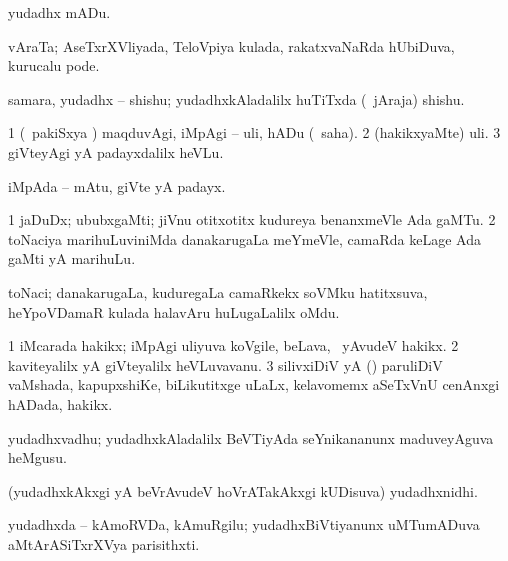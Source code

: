 \bentry
{} 
\gl{\akirx}
\bmng
yudadhx mADu. 
\emng
\eentry

\bentry
{} 
\gl{\saMkiSx}
\expl{}
\bmng
{} 
\emng
\eentry

\bentry
{} 
\gl{\nA}
\expl{}
\bmng
vAraTa; AseTxrXVliyada, TeloVpiya kulada, rakatxvaNaRda hUbiDuva, kurucalu pode. 
\emng
\eentry

\bentry
{} 
\gl{\nA}
\expl{}
\bmng
samara, yudadhx -- shishu; yudadhxkAladalilx huTiTxda (\kanmu\ jAraja) shishu. 
\emng
\eentry

\bentry
{} 
\gl{\sakirx}
\expl{}
\bmng
\bnum
\num{1} (\kanmu\ pakiSxya \vi) maqduvAgi, iMpAgi -- uli, hADu (\akirx\ saha). 
\num{2} (hakikxyaMte) uli. 
\num{3} giVteyAgi yA padayxdalilx heVLu. 
\enum
\emng
\eentry

\bentry
{} 
\gl{\nA}
\expl{}
\bmng
iMpAda -- mAtu, giVte yA padayx. 
\emng
\eentry

\bentry
{} 
\gl{\nA}
\expl{}
\bmng
\bnum
\num{1} jaDuDx; ububxgaMti; jiVnu otitxotitx kudureya benanxmeVle Ada gaMTu. 
\num{2} toNaciya marihuLuviniMda danakarugaLa meYmeVle, camaRda keLage Ada gaMti yA marihuLu. 
\enum
\emng
\eentry

\bentry
{} 
\gl{\nA}
\expl{}
\bmng
toNaci; danakarugaLa, kuduregaLa camaRkekx soVMku hatitxsuva, heYpoVDamaR kulada halavAru huLugaLalilx oMdu. 
\emng
\eentry

\bentry
{} 
\gl{\nA}
\expl{}
\bmng
\bnum
\num{1} iMcarada hakikx; iMpAgi uliyuva koVgile, beLava, \mo\ yAvudeV hakikx. 
\num{2} kaviteyalilx yA giVteyalilx heVLuvavanu. 
\num{3} silivxiDiV yA (\ame) paruliDiV vaMshada, kapupxshiKe, biLikutitxge uLaLx, kelavomemx aSeTxVnU cenAnxgi hADada, hakikx. 
\enum
\emng
\eentry

\bentry
{} 
\gl{\nA}
\expl{}
\bmng
yudadhxvadhu; yudadhxkAladalilx BeVTiyAda seYnikananunx maduveyAguva heMgusu. 
\emng
\eentry

\bentry
{} 
\gl{\nA}
\expl{}
\bmng
(yudadhxkAkxgi yA beVrAvudeV hoVrATakAkxgi kUDisuva) yudadhxnidhi. 
\emng
\eentry

\bentry
{} 
\gl{\nA}
\expl{}
\bmng
yudadhxda -- kAmoRVDa, kAmuRgilu; yudadhxBiVtiyanunx uMTumADuva aMtArASiTxrXVya parisithxti. 
\emng
\eentry

